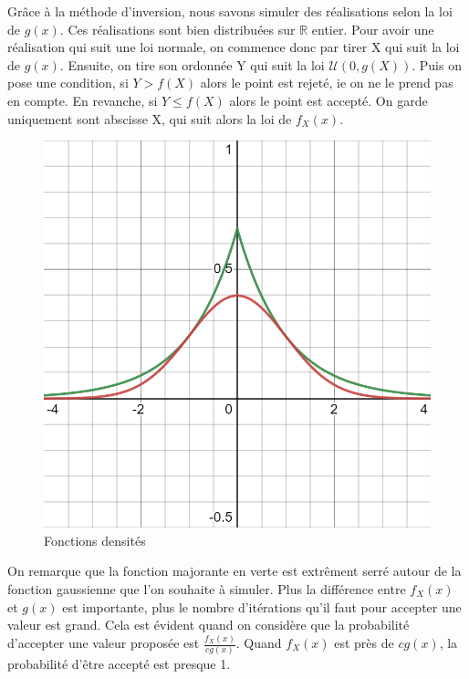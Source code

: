 \documentclass[10pt]{article} %
\begin{document}
Grâce à la méthode d'inversion, nous savons simuler des réalisations selon la loi de $g(x)$. Ces réalisations sont bien distribuées sur $  \mathbb{R} $ entier. Pour avoir une réalisation qui suit une loi normale, on commence donc par tirer X qui suit la loi de $g(x)$. Ensuite, on tire son ordonnée Y qui suit la loi $\mathcal{U}(0, g(X))$. Puis on pose une condition, si $Y > f(X)$ alors le point est rejeté, ie on ne le prend pas en compte. En revanche, si $Y \le f(X)$ alors le point est accepté. On garde uniquement sont abscisse X, qui suit alors la loi de $f_X(x)$.

\newpage

\begin{figure}[h!]
\centering
\includegraphics[scale=0.3]{media/desmos-graph.png}
\caption{Fonctions densités}
\end{figure}

On remarque que la fonction majorante en verte est extrêment serré autour de la fonction gaussienne que l'on souhaite à simuler. Plus la différence entre $f_X(x)$ et $g(x)$ est importante, plus le nombre
d'itérations qu'il faut pour accepter une valeur est grand. Cela est évident quand on considère que la probabilité d'accepter une valeur proposée est $\frac{f_X(x)}{cg(x)}$. Quand $f_X(x)$ est près de $cg(x)$,
la probabilité d'être accepté est presque 1.
\end{document}
